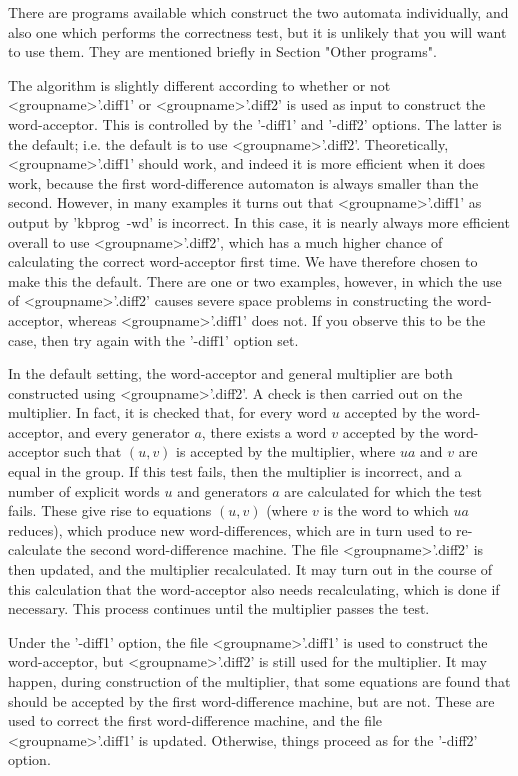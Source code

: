 There are programs available which construct the two automata individually,
and also one which performs the correctness test, but it is unlikely that
you will want to use them. They are mentioned briefly in
Section "Other programs".

The algorithm is slightly different according to whether or not
<groupname>'.diff1' or <groupname>'.diff2' is used as input to construct
the word-acceptor. This is controlled by the '-diff1' and '-diff2' options.
The latter is the default; i.e. the default is to use <groupname>'.diff2'.
Theoretically, <groupname>'.diff1' should work, and indeed it is more
efficient when it does work, because the first word-difference automaton is
always smaller than the second. However, in many examples it turns out that
<groupname>'.diff1' as output by 'kbprog\ -wd' is incorrect. In this case, it
is nearly always more efficient overall to use <groupname>'.diff2', which has
a much higher chance of calculating the correct word-acceptor first time. We
have therefore chosen to make this the default. There are one or two
examples, however, in which the use of <groupname>'.diff2' causes severe
space problems in constructing the word-acceptor, whereas <groupname>'.diff1'
does not. If you observe this to be the case, then try again with the
'-diff1' option set.

In the default setting, the word-acceptor and general multiplier are both
constructed using <groupname>'.diff2'. A check is then carried out on the
multiplier. In fact, it is checked that, for every word $u$ accepted by
the word-acceptor, and every generator $a$, there exists a word $v$
accepted by the word-acceptor such that $(u,v)$ is accepted by the multiplier,
where $ua$ and $v$ are equal in the group.
If this test fails, then the multiplier is incorrect, and a number of explicit
words $u$ and generators $a$ are calculated for which the test fails.
These give rise to equations $(u,v)$ (where $v$ is the word to which
$ua$ reduces), which produce new word-differences, which are in turn used
to re-calculate the second word-difference machine. The file
<groupname>'.diff2' is then updated, and the multiplier recalculated. It
may turn out in the course of this calculation that the word-acceptor also
needs recalculating, which is done if necessary. This process continues
until the multiplier passes the test.

Under the '-diff1' option, the file <groupname>'.diff1' is used to construct
the word-acceptor, but <groupname>'.diff2' is still used for the multiplier.
It may happen, during construction of the multiplier, that some equations
are found that should be accepted by the first word-difference machine, but
are not. These are used to correct the first word-difference machine, and
the file <groupname>'.diff1' is updated. Otherwise, things proceed as for the
'-diff2' option.

